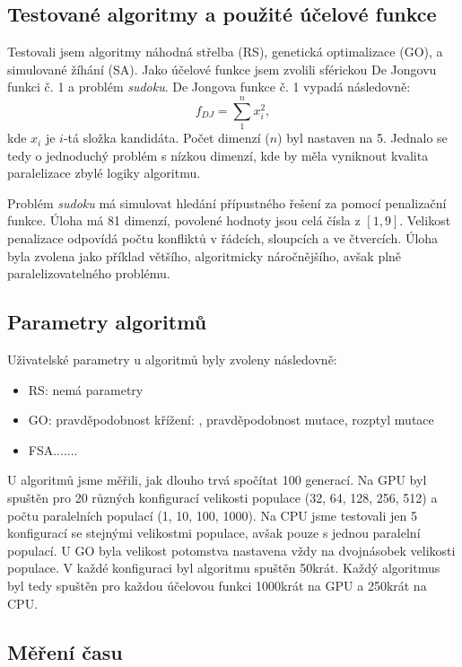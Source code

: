 \subsection{Testované algoritmy a použité účelové funkce}
Testovali jsem algoritmy náhodná střelba (RS), genetická optimalizace (GO), a simulované žíhání (SA). Jako účelové funkce jsem zvolili sférickou De Jongovu funkci č. 1 a problém \emph{sudoku}. De Jongova funkce č. 1 vypadá následovně:
\[
f_{DJ} = \sum_1^n x_i^2,
\]
kde $x_i$ je $i$-tá složka kandidáta. Počet dimenzí ($n$) byl nastaven na 5. Jednalo se tedy o jednoduchý problém s nízkou dimenzí, kde by měla vyniknout kvalita paralelizace zbylé logiky algoritmu.

Problém \emph{sudoku} má simulovat hledání přípustného řešení za pomocí penalizační funkce. Úloha má 81 dimenzí, povolené hodnoty jsou celá čísla z $[1,9]$. Velikost penalizace odpovídá počtu konfliktů v řádcích, sloupcích a ve čtvercích. Úloha byla zvolena jako příklad většího, algoritmicky náročnějšího, avšak plně paralelizovatelného problému.

\subsection{Parametry algoritmů}

Uživatelské parametry u algoritmů byly zvoleny následovně:
\begin{itemize}
  \item RS: nemá parametry
  \item GO: pravděpodobnost křížení: , pravděpodobnost mutace, rozptyl mutace
  \item FSA.......
\end{itemize}

U algoritmů jsme měřili, jak dlouho trvá spočítat 100 generací. Na GPU byl spuštěn pro 20 různých konfigurací velikosti populace (32, 64, 128, 256, 512) a počtu paralelních populací (1, 10, 100, 1000). Na CPU jsme testovali jen 5 konfigurací se stejnými velikostmi populace, avšak pouze s jednou \bq paralelní\eq~ populací. U GO byla velikost potomstva nastavena vždy na dvojnásobek velikosti populace. V každé konfiguraci byl algoritmu spuštěn 50krát. Každý algoritmus byl tedy spuštěn pro každou účelovou funkci 1000krát na GPU a 250krát na CPU.

\subsection{Měření času}

